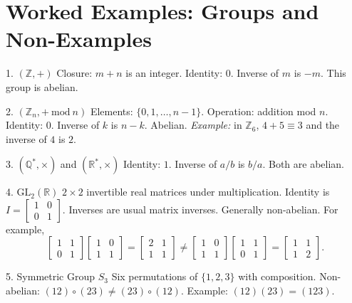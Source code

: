 \documentclass[12pt]{article}
\begin{document}
\section*{Worked Examples: Groups and Non-Examples}
\begin{examplebox}{1. $(\mathbb{Z}, +)$}
Closure: $m+n$ is an integer. Identity: $0$. Inverse of $m$ is $-m$. This group is abelian.
\end{examplebox}

\begin{examplebox}{2. $(\mathbb{Z}_n, +\ \text{mod}\ n)$}
Elements: $\{0,1,\dots,n-1\}$. Operation: addition mod $n$. Identity: $0$. Inverse of $k$ is $n-k$. Abelian.
\textit{Example:} in $\mathbb{Z}_6$, $4+5\equiv3$ and the inverse of $4$ is $2$.
\end{examplebox}

\begin{examplebox}{3. $(\mathbb{Q}^*,\times)$ and $(\mathbb{R}^*,\times)$}
Identity: $1$. Inverse of $a/b$ is $b/a$. Both are abelian.
\end{examplebox}

\begin{examplebox}{4. $\mathrm{GL}_2(\mathbb{R})$}
$2\times2$ invertible real matrices under multiplication. Identity is $I=\begin{bmatrix}1&0\\0&1\end{bmatrix}$. Inverses are usual matrix inverses. Generally non-abelian. For example,\[\begin{bmatrix}1&1\\0&1\end{bmatrix}\begin{bmatrix}1&0\\1&1\end{bmatrix}=\begin{bmatrix}2&1\\1&1\end{bmatrix} \neq \begin{bmatrix}1&0\\1&1\end{bmatrix}\begin{bmatrix}1&1\\0&1\end{bmatrix}=\begin{bmatrix}1&1\\1&2\end{bmatrix}.\]
\end{examplebox}

\begin{examplebox}{5. Symmetric Group $S_3$}
Six permutations of $\{1,2,3\}$ with composition. Non-abelian: $(12)\circ(23) \neq (23)\circ(12)$. Example: $(12)(23)=(123)$.
\end{examplebox}
\end{document}
